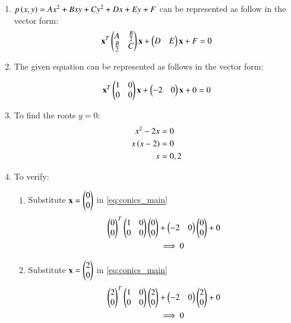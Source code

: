 \renewcommand{\theequation}{\theenumi}
\begin{enumerate}[label=\thesubsection.\arabic*.,ref=\thesubsection.\theenumi]

\item $p\left(x, y\right) = Ax^2 + Bxy + Cy^2 + Dx + Ey + F$ can be represented as follow in the vector form:
\begin{align}
\mathbf{x}^T 
\begin{pmatrix}
A & \frac{B}{2} \\
\frac{B}{2} & C
\end{pmatrix}
\mathbf{x} + 
\begin{pmatrix}
D & E 
\end{pmatrix}
\mathbf{x} + F = 0
\end{align}

\item \begin{flushleft}
The given equation can be represented as follows in the vector form:
\end{flushleft}
\begin{align}
\mathbf{x}^T 
\begin{pmatrix}
1 & 0 \\
0 & 0
\end{pmatrix}
\mathbf{x} + 
\begin{pmatrix}
-2 & 0 
\end{pmatrix}
\mathbf{x} + 0 = 0 \label{eq:conics_main}
\end{align}

\item To find the roots $y=0$:
\begin{align}
x^2 - 2x &= 0 \\
x\left(x-2\right) &= 0 \\
x &= 0,2
\end{align}

\item To verify:
\begin{enumerate}
\item Substitute $\mathbf{x} = \begin{pmatrix}0\\0\end{pmatrix}$ in \eqref{eq:conics_main}
\begin{align}
\begin{pmatrix}0\\0\end{pmatrix}^T 
\begin{pmatrix}
1 & 0 \\
0 & 0
\end{pmatrix}
\begin{pmatrix}0\\0\end{pmatrix} &+ 
\begin{pmatrix}
-2 & 0 
\end{pmatrix}
\begin{pmatrix}0\\0\end{pmatrix} + 0 \\
&\implies 0
\end{align}

\item  Substitute $\mathbf{x} = \begin{pmatrix}2\\0\end{pmatrix}$ in \eqref{eq:conics_main}
\begin{align}
\begin{pmatrix}2\\0\end{pmatrix}^T 
\begin{pmatrix}
1 & 0 \\
0 & 0
\end{pmatrix}
\begin{pmatrix}2\\0\end{pmatrix} &+ 
\begin{pmatrix}
-2 & 0 
\end{pmatrix}
\begin{pmatrix}2\\0\end{pmatrix} + 0 \\
&\implies 0
\end{align}
\end{enumerate}


\end{enumerate}

